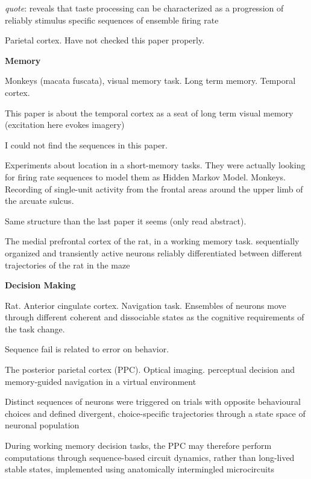 \documentclass[10pt,a4paper]{article}
\begin{document}
\textit{quote}: reveals that taste processing can be characterized as a progression of reliably stimulus specific sequences of ensemble firing rate

\cite{jones2007natural}

Parietal cortex. Have not checked this paper properly.
\cite{crowe2010rapid}

\textbf{Memory}

Monkeys (macata fuscata), visual memory task. Long term memory. Temporal cortex.

This paper is about the temporal cortex as a seat of long term visual memory (excitation here evokes imagery)

I could not find the sequences in this paper.
\cite{miyashita1988neuronal}

Experiments about location in a short-memory tasks. They were actually looking for firing rate sequences to model them as Hidden Markov Model. Monkeys. Recording of single-unit activity from the frontal areas around the upper limb of the arcuate sulcus.
\cite{abeles1995cortical}

Same structure than the last paper it seems (only read abstract). 
\cite{seidemann1996simultaneously}

The medial prefrontal cortex of the rat, in a working memory task. sequentially organized and transiently active neurons reliably differentiated between different trajectories of the rat in the maze

\cite{fujisawa2008behavior} 

\textbf{Decision Making}

Rat. Anterior cingulate cortex. Navigation task. Ensembles of neurons move through different coherent and dissociable states as the cognitive requirements of the task change.

Sequence fail is related to error on behavior. 
\cite{lapish2008successful}


The posterior parietal cortex (PPC). Optical imaging.  perceptual decision and memory-guided navigation in a virtual environment

Distinct sequences of neurons were triggered on trials with opposite behavioural choices and defined divergent, choice-specific trajectories through a state space of neuronal population 

During working memory decision tasks, the PPC may therefore perform computations through sequence-based circuit dynamics, rather than long-lived stable states, implemented using anatomically intermingled microcircuits
\end{document}
